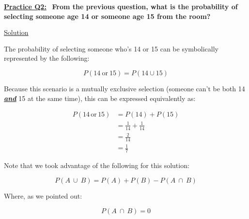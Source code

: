 \underline{\textbf{Practice Q2:}} \ \textbf{From the previous question, what is the probability of selecting someone
age 14 or someone age 15 from the room?}

\bigskip

\underline{Solution}

The probability of selecting someone who's 14 or 15 can be symbolically represented by the following:

\[
    P(14 \ \text{or} \ 15) = P(14 \cup 15)
\]

Because this scenario is a mutually exclusive selection (someone can't be both
14 \textit{\textbf{\underline{and}}} 15 at the same time), this can be expressed
equivalently as:

\begin{align*}
    P(14 \, \text{or} \, 15) &= P(14) + P(15) \\[1.5ex]
    &= \frac{1}{14} + \frac{1}{14} \\[1.5ex]
    &= \frac{2}{14} \\[1.5ex]
    &= \boxed{\frac{1}{7}}
\end{align*}

Note that we took advantage of the following for this solution:

\[
    P(A \ \cup \ B) = P(A) + P(B) - P(A \ \cap \ B)
\]


Where, as we pointed out:

\[
    P(A \ \cap \ B) = 0
\]